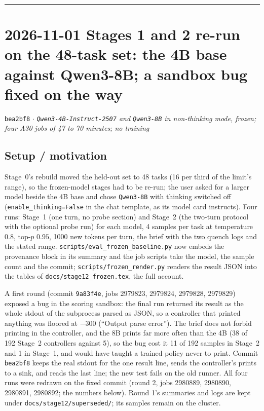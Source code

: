 \documentclass[11pt,a4paper]{article}
\newcommand{\commit}[1]{\texttt{\textcolor{commitgray}{#1}}}
\begin{document}
\bigskip
\hrule
\bigskip

\section*{2026-11-01 \quad Stages 1 and 2 re-run on the 48-task set: the 4B
base against Qwen3-8B; a sandbox bug fixed on the way}

\commit{bea2bf8} $\cdot$ \textit{\texttt{Qwen3-4B-Instruct-2507} and
\texttt{Qwen3-8B} in non-thinking mode, frozen; four A30 jobs of 47 to 70
minutes; no training}

\subsection*{Setup / motivation}

Stage~0's rebuild moved the held-out set to 48 tasks (16 per third of the
limit's range), so the frozen-model stages had to be re-run; the user asked
for a larger model beside the 4B base and chose \texttt{Qwen3-8B} with
thinking switched off (\texttt{enable\_thinking=False} in the chat template,
as its model card instructs). Four runs: Stage~1 (one turn, no probe
section) and Stage~2 (the two-turn protocol with the optional probe run) for
each model, 4 samples per task at temperature $0.8$, top-$p$ $0.95$, 1000 new
tokens per turn, the brief with the two quench logs and the stated range.
\texttt{scripts/eval\_frozen\_baseline.py} now embeds the provenance block in
its summary and the job scripts take the model, the sample count and the
commit; \texttt{scripts/frozen\_render.py} renders the result JSON into the
tables of \texttt{docs/stage12\_frozen.tex}, the full account.

A first round (commit \texttt{9a83f4e}, jobs 2979823, 2979824, 2979828,
2979829) exposed a bug in the scoring sandbox: the final run returned its
result as the whole stdout of the subprocess parsed as JSON, so a controller
that printed anything was floored at $-300$ (``Output parse error''). The
brief does not forbid printing in the controller, and the 8B prints far more
often than the 4B (38 of 192 Stage~2 controllers against 5), so the bug cost
it 11 of 192 samples in Stage~2 and 1 in Stage~1, and would have taught a
trained policy never to print. Commit \texttt{bea2bf8} keeps the real stdout
for the one result line, sends the controller's prints to a sink, and reads
the last line; the new test fails on the old runner. All four runs were
redrawn on the fixed commit (round 2, jobs 2980889, 2980890, 2980891,
2980892; the numbers below). Round 1's summaries and logs are kept under
\texttt{docs/stage12/superseded/}; its samples remain on the cluster.
\end{document}
